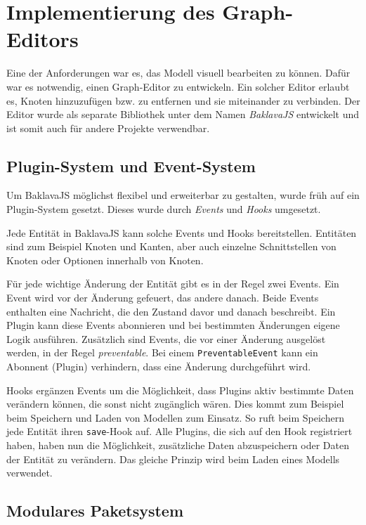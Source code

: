 
\chapter{Implementierung des Graph-Editors}
\label{sec:grapheditor}

Eine der Anforderungen war es, das Modell visuell bearbeiten zu können. Dafür war es notwendig, einen Graph-Editor zu entwickeln. Ein solcher Editor erlaubt es, Knoten hinzuzufügen bzw. zu entfernen und sie miteinander zu verbinden. Der Editor wurde als separate Bibliothek unter dem Namen \textit{BaklavaJS} entwickelt und ist somit auch für andere Projekte verwendbar.

\section{Plugin-System und Event-System}

Um BaklavaJS möglichst flexibel und erweiterbar zu gestalten, wurde früh auf ein Plugin-System gesetzt. Dieses wurde durch \textit{Events} und \textit{Hooks} umgesetzt.

Jede Entität in BaklavaJS kann solche Events und Hooks bereitstellen. Entitäten sind zum Beispiel Knoten und Kanten, aber auch einzelne Schnittstellen von Knoten oder Optionen innerhalb von Knoten.

Für jede wichtige Änderung der Entität gibt es in der Regel zwei Events. Ein Event wird vor der Änderung gefeuert, das andere danach. Beide Events enthalten eine Nachricht, die den Zustand davor und danach beschreibt. Ein Plugin kann diese Events abonnieren und bei bestimmten Änderungen eigene Logik ausführen. Zusätzlich sind Events, die vor einer Änderung ausgelöst werden, in der Regel \textit{preventable}. Bei einem \texttt{PreventableEvent} kann ein Abonnent (Plugin) verhindern, dass eine Änderung durchgeführt wird.

Hooks ergänzen Events um die Möglichkeit, dass Plugins aktiv bestimmte Daten verändern können, die sonst nicht zugänglich wären. Dies kommt zum Beispiel beim Speichern und Laden von Modellen zum Einsatz. So ruft beim Speichern jede Entität ihren \texttt{save}-Hook auf. Alle Plugins, die sich auf den Hook registriert haben, haben nun die Möglichkeit, zusätzliche Daten abzuspeichern oder Daten der Entität zu verändern. Das gleiche Prinzip wird beim Laden eines Modells verwendet.

\section{Modulares Paketsystem}

